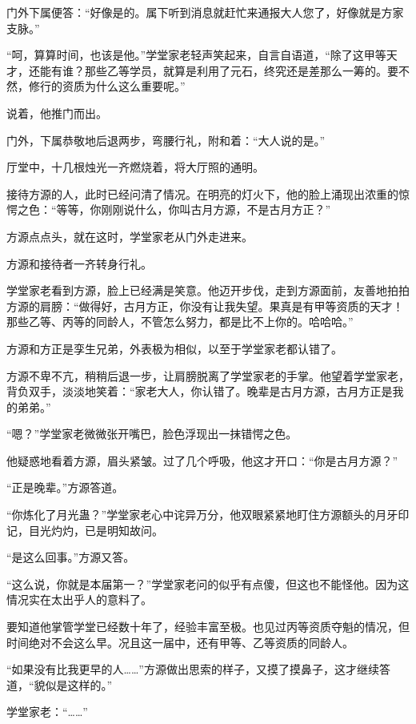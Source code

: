 \begin{this_body}
门外下属便答：“好像是的。属下听到消息就赶忙来通报大人您了，好像就是方家支脉。”

“呵，算算时间，也该是他。”学堂家老轻声笑起来，自言自语道，“除了这甲等天才，还能有谁？那些乙等学员，就算是利用了元石，终究还是差那么一筹的。要不然，修行的资质为什么这么重要呢。”

说着，他推门而出。

门外，下属恭敬地后退两步，弯腰行礼，附和着：“大人说的是。”

厅堂中，十几根烛光一齐燃烧着，将大厅照的通明。

接待方源的人，此时已经问清了情况。在明亮的灯火下，他的脸上涌现出浓重的惊愕之色：“等等，你刚刚说什么，你叫古月方源，不是古月方正？”

方源点点头，就在这时，学堂家老从门外走进来。

方源和接待者一齐转身行礼。

学堂家老看到方源，脸上已经满是笑意。他迈开步伐，走到方源面前，友善地拍拍方源的肩膀：“做得好，古月方正，你没有让我失望。果真是有甲等资质的天才！那些乙等、丙等的同龄人，不管怎么努力，都是比不上你的。哈哈哈。”

方源和方正是孪生兄弟，外表极为相似，以至于学堂家老都认错了。

方源不卑不亢，稍稍后退一步，让肩膀脱离了学堂家老的手掌。他望着学堂家老，背负双手，淡淡地笑着：“家老大人，你认错了。晚辈是古月方源，古月方正是我的弟弟。”

“嗯？”学堂家老微微张开嘴巴，脸色浮现出一抹错愕之色。

他疑惑地看着方源，眉头紧皱。过了几个呼吸，他这才开口：“你是古月方源？”

“正是晚辈。”方源答道。

“你炼化了月光蛊？”学堂家老心中诧异万分，他双眼紧紧地盯住方源额头的月牙印记，目光灼灼，已是明知故问。

“是这么回事。”方源又答。

“这么说，你就是本届第一？”学堂家老问的似乎有点傻，但这也不能怪他。因为这情况实在太出乎人的意料了。

要知道他掌管学堂已经数十年了，经验丰富至极。也见过丙等资质夺魁的情况，但时间绝对不会这么早。况且这一届中，还有甲等、乙等资质的同龄人。

“如果没有比我更早的人……”方源做出思索的样子，又摸了摸鼻子，这才继续答道，“貌似是这样的。”

学堂家老：“……”

\end{this_body}

